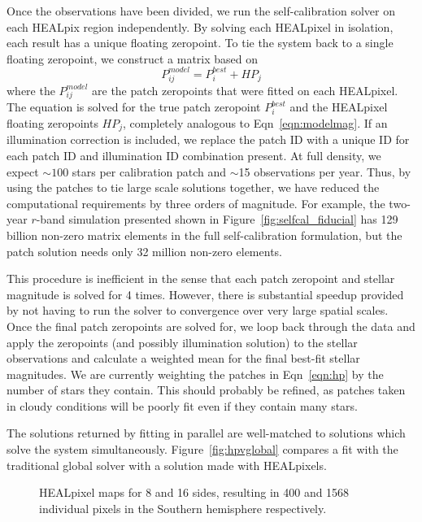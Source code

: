 \documentclass[12pt,preprint]{aastex}
\begin{document}
Once the observations have been divided, we run the self-calibration solver on each HEALpix region independently.  By solving each HEALpixel in isolation, each result has a unique floating zeropoint.  To tie the system back to a single floating zeropoint, we construct a matrix based on
\begin{equation}\label{eqn:hp}
P^{model}_{ij} = P^{best}_{i} + HP_{j}
\end{equation}
where the $P^{model}_{ij}$ are the patch zeropoints that were fitted on each HEALpixel.  The equation is solved for the true patch zeropoint $P^{best}_{i}$ and the HEALpixel floating zeropoints $HP_{j}$, completely analogous to Eqn~\ref{eqn:modelmag}.  If an illumination correction is included, we replace the patch ID with a unique ID for each patch ID and illumination ID combination present.  At full density, we expect $\sim100$ stars per calibration patch and $\sim$15 observations per year.  Thus, by using the patches to tie large scale solutions together, we have reduced the computational requirements by three orders of magnitude.  For example, the two-year $r$-band simulation presented shown in Figure~\ref{fig:selfcal_fiducial} has 129 billion non-zero matrix elements in the full self-calibration formulation, but the patch solution needs only 32 million non-zero elements.  

This procedure is inefficient in the sense that each patch zeropoint and stellar magnitude is solved for 4 times.  However, there is substantial speedup provided by not having to run the solver to convergence over very large spatial scales.  Once the final patch zeropoints are solved for, we loop back through the data and apply the zeropoints (and possibly illumination solution) to the stellar observations and calculate a weighted mean for the final best-fit stellar magnitudes.  We are currently weighting the patches in Eqn~\ref{eqn:hp} by the number of stars they contain.  This should probably be refined, as patches taken in cloudy conditions will be poorly fit even if they contain many stars.  

The solutions returned by fitting in parallel are well-matched to solutions which solve the system simultaneously.  Figure~\ref{fig:hpvglobal} compares a fit with the traditional global solver with a solution made with HEALpixels.  


\begin{figure}
\caption{HEALpixel maps for 8 and 16 sides, resulting in 400 and 1568 individual pixels in the Southern hemisphere respectively.}
\end{figure}
\end{document}
